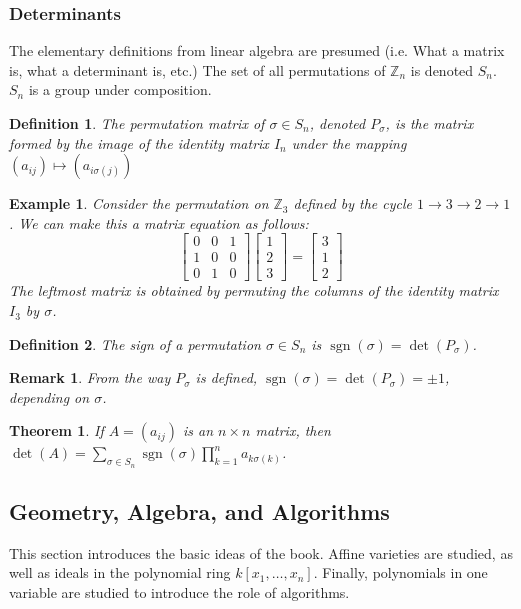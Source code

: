 \documentclass[oneside]{book}
\theoremstyle{mystyle}
\newtheorem{theorem}{Theorem}[section]
\newtheorem{definition}{Definition}[section]
\newtheorem{example}{Example}[section]
\newtheorem{remark}{Remark}[section]
\DeclareMathOperator{\sgn}{sgn}
\begin{document}
\subsubsection{Determinants}
The elementary definitions from linear algebra are presumed (i.e. What a matrix is, what a determinant is, etc.) The set of all permutations of $\mathbb{Z}_{n}$ is denoted $S_n$. $S_{n}$ is a group under composition.
\begin{definition}
The permutation matrix of $\sigma \in S_{n}$, denoted $P_{\sigma}$, is the matrix formed by the image of the identity matrix $I_{n}$ under the mapping $(a_{ij})\mapsto (a_{i\sigma(j)})$
\end{definition}
\begin{example}
Consider the permutation on $\mathbb{Z}_3$ defined by the cycle $1\rightarrow 3 \rightarrow 2 \rightarrow 1$. We can make this a matrix equation as follows:
\begin{equation*}
    \begin{bmatrix} 0 & 0 & 1 \\ 1 & 0 & 0 \\ 0 & 1 & 0 \end{bmatrix} \begin{bmatrix} 1 \\ 2 \\ 3 \end{bmatrix} = \begin{bmatrix} 3 \\ 1 \\ 2 \end{bmatrix}    
\end{equation*}
The leftmost matrix is obtained by permuting the columns of the identity matrix $I_{3}$ by $\sigma$.
\end{example}
\begin{definition}
The sign of a permutation $\sigma\in S_{n}$ is $\sgn(\sigma) = \det(P_{\sigma})$.
\end{definition}
\begin{remark}
From the way $P_{\sigma}$ is defined, $\sgn(\sigma) = \det(P_{\sigma}) = \pm 1$, depending on $\sigma$.
\end{remark}
\begin{theorem}
If $A=(a_{ij})$ is an $n\times n$ matrix, then $\det(A) = \underset{\sigma \in S_n}\sum \sgn(\sigma) \prod_{k=1}^{n} a_{k\sigma(k)}$.
\end{theorem}
\subsection{Geometry, Algebra, and Algorithms}
This section introduces the basic ideas of the book. Affine varieties are studied, as well as ideals in the polynomial ring $k[x_1,\hdots ,x_n]$. Finally, polynomials in one variable are studied to introduce the role of algorithms.
\end{document}
